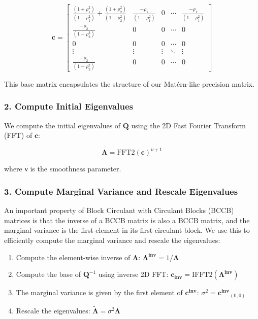 \documentclass[journal=,manuscript=]{achemso}
\providecommand{\tightlist}{%
  \setlength{\itemsep}{0pt}\setlength{\parskip}{0pt}}\usepackage{longtable,booktabs,array}
\begin{document}
\[
\mathbf{c} = \begin{bmatrix}
\frac{(1+\rho_1^2)}{(1 - \rho_1^2)} + \frac{(1+\rho_2^2)}{(1 - \rho_2^2)} & \frac{-\rho_1}{(1 - \rho_1^2)} & 0 & \cdots  & \frac{-\rho_1}{(1 - \rho_1^2)} \\
\frac{-\rho_2}{(1 - \rho_2^2)} & 0 & 0 & \cdots  & 0 \\
0 & 0 & 0 & \cdots  & 0 \\
\vdots & \vdots & \vdots & \ddots &  \vdots \\
\frac{-\rho_2}{(1 - \rho_2^2)} & 0 & 0 & \cdots  & 0
\end{bmatrix}
\]

This base matrix encapsulates the structure of our Matérn-like precision
matrix.

\subsubsection{2. Compute Initial
Eigenvalues}\label{compute-initial-eigenvalues}

We compute the initial eigenvalues of \(\mathbf Q\) using the 2D Fast
Fourier Transform (FFT) of \(\mathbf c\):

\[
\boldsymbol{\Lambda} = \text{FFT2}(\mathbf{c})^{\nu+1}
\]

where ν is the smoothness parameter.

\subsubsection{3. Compute Marginal Variance and Rescale
Eigenvalues}\label{compute-marginal-variance-and-rescale-eigenvalues}

An important property of Block Circulant with Circulant Blocks (BCCB)
matrices is that the inverse of a BCCB matrix is also a BCCB matrix, and
the marginal variance is the first element in its first circulant block.
We use this to efficiently compute the marginal variance and rescale the
eigenvalues:

\begin{enumerate}
\def\labelenumi{\alph{enumi}.}
\tightlist
\item
  Compute the element-wise inverse of \(\boldsymbol{\Lambda}\):
  \(\mathbf{\Lambda^{inv}} = 1 / \boldsymbol{\Lambda}\)
\item
  Compute the base of \(\mathbf Q^{-1}\) using inverse 2D FFT:
  \(\mathbf{c_{inv}} = \text{IFFT2}(\mathbf{{\Lambda^{inv}}})\)
\item
  The marginal variance is given by the first element of
  \(\mathbf{c^{inv}}\): \(\sigma^2 = \mathbf{c^{inv}}_{(0,0)}\)
\item
  Rescale the eigenvalues:
  \(\boldsymbol{\widetilde \Lambda} = \sigma^2 \boldsymbol{\Lambda}\)
\end{enumerate}
\end{document}
